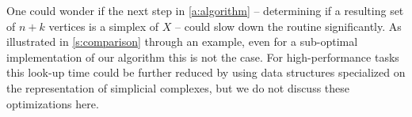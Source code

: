 One could wonder if the next step in \cref{a:algorithm} -- determining if a resulting set of $n+k$ vertices is a simplex of $X$ -- could slow down the routine significantly.
As illustrated in \cref{s:comparison} through an example, even for a sub-optimal implementation of our algorithm this is not the case.
For high-performance tasks this look-up time could be further reduced by using data structures specialized on the representation of simplicial complexes, but we do not discuss these optimizations here.